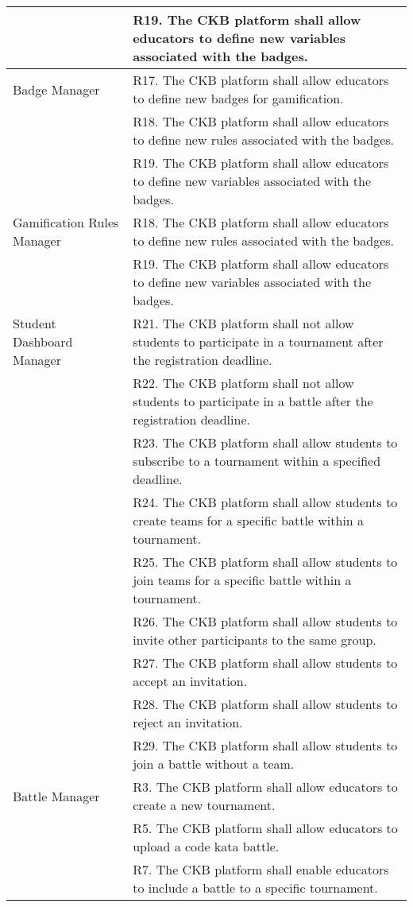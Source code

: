 \begin{center}
\begin{longtable}{p{0.3\linewidth}p{0.7\linewidth}}
        & R19. The CKB platform shall allow educators to define new variables associated with the badges. \\
        \hline
        Badge Manager & R17. The CKB platform shall allow educators to define new badges for gamification. \\
        & R18. The CKB platform shall allow educators to define new rules associated with the badges. \\
        & R19. The CKB platform shall allow educators to define new variables associated with the badges. \\
        \hline
        Gamification Rules Manager & R18. The CKB platform shall allow educators to define new rules associated with the badges. \\
        & R19. The CKB platform shall allow educators to define new variables associated with the badges. \\
        \hline
        Student Dashboard Manager & R21. The CKB platform shall not allow students to participate in a tournament after the registration deadline. \\
        & R22. The CKB platform shall not allow students to participate in a battle after the registration deadline. \\
        & R23. The CKB platform shall allow students to subscribe to a tournament within a specified deadline. \\
        & R24. The CKB platform shall allow students to create teams for a specific battle within a tournament. \\
        & R25. The CKB platform shall allow students to join teams for a specific battle within a tournament. \\
        & R26. The CKB platform shall allow students to invite other participants to the same group. \\
        & R27. The CKB platform shall allow students to accept an invitation. \\
        & R28. The CKB platform shall allow students to reject an invitation. \\
        & R29. The CKB platform shall allow students to join a battle without a team. \\
        \hline
        Battle Manager & R3. The CKB platform shall allow educators to create a new tournament. \\
        & R5. The CKB platform shall allow educators to upload a code kata battle. \\
        & R7. The CKB platform shall enable educators to include a battle to a specific tournament. \\

\end{longtable}
\end{center}
